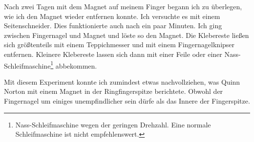 Nach zwei Tagen mit dem Magnet auf meinem Finger begann ich zu überlegen, wie ich den Magnet wieder
entfernen konnte. Ich versuchte es mit einem Seitenschneider. Dies funktionierte auch nach ein paar
Minuten. Ich ging zwischen Fingernagel und Magnet und löste so den Magnet. Die Klebereste ließen
sich größtenteils mit einem Teppichmesser und mit einem Fingernagelknipser entfernen.
Kleinere Klebereste lassen sich dann mit einer Feile oder einer
Nass-Schleifmaschine\footnote{Nass-Schleifmaschine wegen der geringen Drehzahl. Eine normale
Schleifmaschine ist nicht empfehlenswert.} abbekommen.

Mit diesem Experiment konnte ich zumindest etwas nachvollziehen, was Quinn Norton mit einem Magnet
in der Ringfingerspitze berichtete. Obwohl der Fingernagel um einiges unempfindlicher sein dürfe als
das Innere der Fingerspitze.
